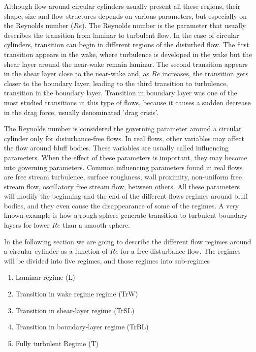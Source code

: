 \documentclass[journal]{new-aiaa}
\begin{document}
Although flow around circular cylinders usually present all these regions, their shape, size and flow structures depends on various parameters, but especially on the Reynolds number ($Re$). The Reynolds number is the parameter that usually describes the transition from laminar to turbulent flow. In the case of circular cylinders, transition can begin in different regions of the disturbed flow. The first transition appears in the wake, where turbulence is developed in the wake but the shear layer around the near-wake remain laminar. The second transition appears in the shear layer close to the near-wake and, as $Re$ increases, the transition gets closer to the boundary layer, leading to the third transition to turbulence, transition in the boundary layer. Transition in boundary layer was one of the most studied transitions in this type of flows, because it causes a sudden decrease in the drag force, usually denominated 'drag crisis'.

The Reynolds number is considered the governing parameter around a circular cylinder only for disturbance-free flows. In real flows, other variables may affect the flow around bluff bodies. These variables are usually called influencing parameters. When the effect of these parameters is important, they may become into governing parameters. Common influencing parameters found in real flows are free stream turbulence, surface roughness, wall proximity, non-uniform free stream flow, oscillatory free stream flow, between others. All these parameters will modify the beginning and the end of the different flows regimes around bluff bodies, and they even cause the disappearance of some of the regimes. A very known example is how a rough sphere generate transition to turbulent boundary layers for lower $Re$ than a smooth sphere.

In the following section we are going to describe the different flow regimes around a circular cylinder as a function of $Re$ for a free-disturbance flow. The regimes will be divided into five regimes, and those regimes into sub-regimes

\begin{enumerate}[label=(\roman*)]
\item Laminar regime (L)
\item Transition in wake regime regime (TrW)
\item Transition in shear-layer regime (TrSL)
\item Transition in boundary-layer regime (TrBL)
\item Fully turbulent Regime (T)
\end{enumerate}
\end{document}
